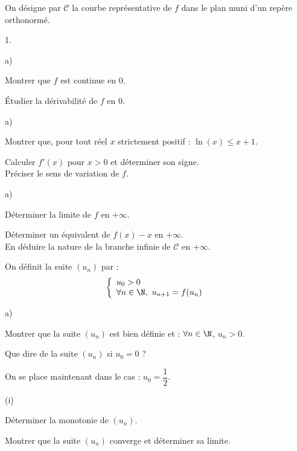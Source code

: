 \documentclass[11pt]{article}%
\begin{document}
On désigne par $\mathcal{C}$ la courbe représentative de $f$ dans le 
plan muni d'un repère orthonormé.
\begin{noliste}{1.}
  \item
  \begin{noliste}{a)}
    \item Montrer que $f$ est continue en $0$.
    
    \item Étudier la dérivabilité de $f$ en $0$.
  \end{noliste}
  
  \item
  \begin{noliste}{a)}
    \item Montrer que, pour tout réel $x$ strictement positif : 
    $\ln (x) \leq x+1$.
    
    \item Calculer $f'(x)$ pour $x>0$ et déterminer son signe.\\ 
    Préciser le sens de variation de $f$.
  \end{noliste}
  
  \item
  \begin{noliste}{a)}
    \item Déterminer la limite de $f$ en $+\infty $.
    
    \item Déterminer un équivalent de $f(x)-x$ en $+\infty $.\\ 
    En déduire la nature de la branche infinie de $\mathcal{C}$ en $+
    \infty $.
  \end{noliste}
  
  \item On définit la suite $(u_n)$ par :
  \[
   \left\{
   \begin{array}{l}
    u_0 >0\\
    \forall n \in \N, \ u_{n+1} = f(u_n)
   \end{array}
   \right.
  \]
  \begin{noliste}{a)}
    \item Montrer que la suite $(u_n)$ est bien définie et : 
    $\forall n \in \N$, $u_n >0$.
    
    \item Que dire de la suite $(u_n)$ si $u_0=0$ ?
    
    \item On se place maintenant dans le cas : $u_0= \dfrac{1}{2}$.
    \begin{nonoliste}{(i)}
     \item Déterminer la monotonie de $(u_n)$.
     
     \item Montrer que la suite $(u_n)$ converge et 
     déterminer sa limite.
    \end{nonoliste}
  \end{noliste}
\end{noliste}
\end{document}
